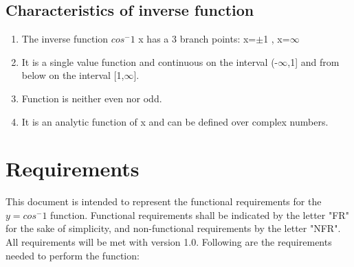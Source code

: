 \documentclass{article}
\begin{document}
    {

        \subsection{Characteristics of inverse function}}
    \justify
    \begin{enumerate}
        \item  The inverse function $cos^-1$ x has a 3 branch points: x=$\pm $1 , x=$\infty$
        \item It is a single value function and continuous on the interval (-$\infty$,1] and from below on the interval [1,$\infty$].
        \item Function is neither even nor odd.
        \item It is an analytic function of x and can be defined over complex numbers.
    \end{enumerate}


    \section{Requirements}
    This document is intended to represent the functional requirements for the $y = cos^-1$ function.
    Functional requirements shall be indicated by the letter "FR" for the sake of simplicity, and non-functional requirements by the letter "NFR". All requirements will be met with version 1.0.
    Following are the requirements needed to perform the function:
\end{document}
